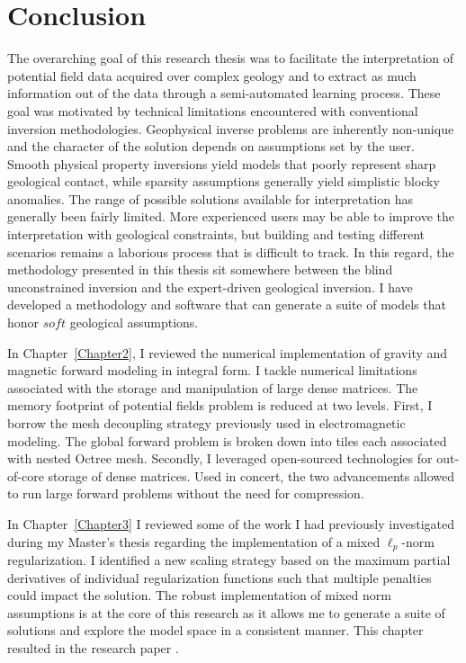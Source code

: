 \graphicspath{{./../Figures/}}
\chapter{Conclusion}
\label{Chapter8}

The overarching goal of this research thesis was to facilitate the interpretation of potential field data acquired over complex geology and to extract as much information out of the data through a semi-automated learning process.
These goal was motivated by technical limitations encountered with conventional inversion methodologies.
Geophysical inverse problems are inherently non-unique and the character of the solution depends on assumptions set by the user.
Smooth physical property inversions yield models that poorly represent sharp geological contact, while sparsity assumptions generally yield simplistic blocky anomalies. The range of possible solutions available for interpretation has generally been fairly limited.
More experienced users may be able to improve the interpretation with geological constraints, but building and testing different scenarios remains a laborious process that is difficult to track.
In this regard, the methodology presented in this thesis sit somewhere  between the blind unconstrained inversion and the expert-driven geological inversion. I have developed a methodology and software that can generate a suite of models that honor $soft$ geological assumptions.

In Chapter~\ref{Chapter2}, I reviewed the numerical implementation of gravity and magnetic forward modeling in integral form. I tackle numerical limitations associated with the storage and manipulation of large dense matrices. The memory footprint of potential fields problem is reduced at two levels. First, I borrow the mesh decoupling strategy previously used in electromagnetic modeling. The global forward problem is broken down into tiles each associated with nested Octree mesh. Secondly, I leveraged open-sourced technologies for out-of-core storage of dense matrices. Used in concert, the two advancements allowed to run large forward problems without the need for compression.

In Chapter~\ref{Chapter3} I reviewed some of the work I had previously investigated during my Master's thesis regarding the implementation of a mixed $\ell_p$-norm regularization. I identified a new scaling strategy based on the maximum partial derivatives of individual regularization functions such that multiple penalties could impact the solution. The robust implementation of mixed norm assumptions is at the core of this research as it allows me to generate a suite of solutions and explore the model space in a consistent manner.
This chapter resulted in the research paper \cite{Fournier2019}.

